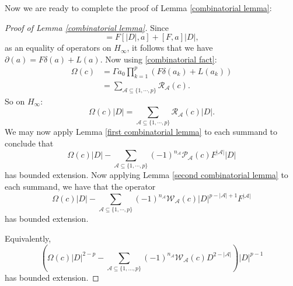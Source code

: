     Now we are ready to complete the proof of Lemma \ref{combinatorial lemma}:

    \begin{proof}[Proof of Lemma \ref{combinatorial lemma}] 
        Since
        \begin{equation*}
            [D,a] = F[|D|,a]+[F,a]|D|,
        \end{equation*}
        as an equality of operators on $H_\infty$, it follows that we have $\partial(a) = F\delta(a)+L(a)$.
        Now using \eqref{combinatorial fact}:
        \begin{align*}
            \Omega(c) &= \Gamma a_0\prod_{k=1}^p (F\delta(a_k)+L(a_k))\\
                      &= \sum_{\mathscr{A}\subseteq \{1,\cdots,p\}} \mathcal{R}_{\mathscr{A}}(c).
        \end{align*}
        So on $H_\infty$:
        \begin{equation*}
            \Omega(c)|D| = \sum_{\mathscr{A}\subseteq \{1,\cdots,p\}} \mathcal{R}_{\mathscr{A}}(c)|D|.
        \end{equation*}
        We may now apply Lemma \ref{first combinatorial lemma} to each summand to conclude that
        \begin{equation*}
            \Omega(c)|D| - \sum_{\mathscr{A}\subseteq \{1,\cdots,p\}} (-1)^{n_{\mathscr{A}}}\mathcal{P}_{\mathscr{A}}(c)F^{|\mathscr{A}|}|D|
        \end{equation*}
        has bounded extension.
        Now applying Lemma \ref{second combinatorial lemma} to each summand, we have that the operator
        \begin{equation*}
            \Omega(c)|D|-\sum_{\mathscr{A}\subseteq \{1,\cdots,p\}}(-1)^{n_{\mathscr{A}}}\mathcal{W}_{\mathscr{A}}(c)|D|^{p-|\mathscr{A}|+1}F^{|\mathscr{A}|}
        \end{equation*}
        has bounded extension.
        
        Equivalently,
        \begin{equation*}
            \left(\Omega(c)|D|^{2-p}-\sum_{\mathscr{A}\subseteq \{1,\ldots,p\}}(-1)^{n_{\mathscr{A}}}\mathcal{W}_{\mathscr{A}}(c)D^{2-|\mathscr{A}|}\right)|D|^{p-1}
        \end{equation*}
        has bounded extension.
    \end{proof}
    
